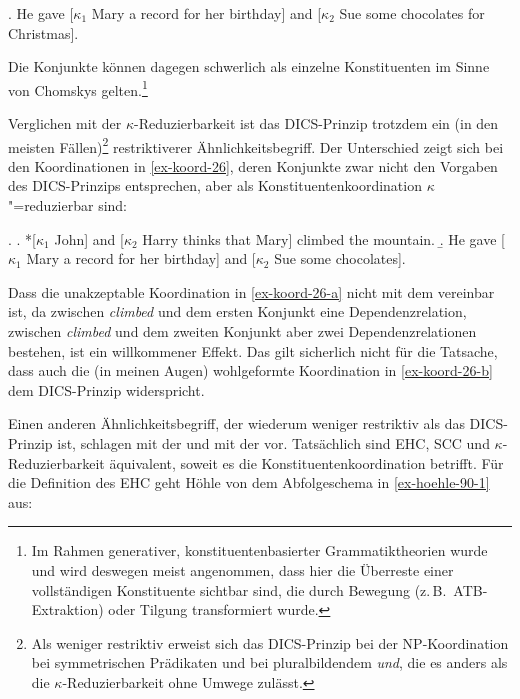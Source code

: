 \ex. \label{ex-hudson88-35} He gave [$\kappa_1$ Mary a record for her birthday] and [$\kappa_2$ Sue some chocolates for Christmas].\hfill \citep[(35)]{Hudson:88}

Die Konjunkte können dagegen schwerlich als einzelne Konstituenten im Sinne von Chomskys  gelten.\footnote{Im Rahmen generativer, konstituentenbasierter Grammatiktheorien wurde und wird deswegen meist angenommen, dass hier die Überreste einer vollständigen Konstituente sichtbar sind, die durch Bewegung (z.\,B.\ ATB-Extraktion) oder Tilgung transformiert wurde.}

Verglichen mit der $\kappa$-Reduzierbarkeit ist das DICS-Prinzip trotzdem ein (in den meisten Fällen)\footnote{Als weniger restriktiv erweist sich das DICS-Prinzip bei der NP-Koordination bei symmetrischen Prädikaten und bei pluralbildendem {\it und}, die es anders als die $\kappa$-Reduzierbarkeit ohne Umwege zulässt.} restriktiverer Ähnlichkeitsbegriff. Der Unterschied zeigt sich bei den Koordinationen in \ref{ex-koord-26}, deren Konjunkte zwar nicht den Vorgaben des DICS-Prinzips entsprechen, aber als Konstituentenkoordination $\kappa$"=reduzierbar sind:

\ex. \label{ex-koord-26}
\a. *[$\kappa_1$ John] and [$\kappa_2$ Harry thinks that Mary] climbed the mountain. \hfill \citep[(47a)]{Pickering:Barry:93}\label{ex-koord-26-a}
\b. He gave [$\kappa_1$ Mary a record for her birthday] and [$\kappa_2$ Sue some chocolates].\label{ex-koord-26-b} 

Dass die unakzeptable Koordination in \ref{ex-koord-26-a} nicht mit dem  vereinbar ist, da zwischen {\it climbed} und dem ersten Konjunkt eine Dependenzrelation, zwischen {\it climbed} und dem zweiten Konjunkt aber zwei Dependenzrelationen bestehen, ist ein willkommener Effekt. Das gilt sicherlich nicht für die Tatsache, dass auch die (in meinen Augen) wohlgeformte Koordination in \ref{ex-koord-26-b} dem DICS-Prinzip widerspricht. 

Einen anderen Ähnlichkeitsbegriff, der wiederum weniger restriktiv als das DICS-Prinzip ist, schlagen \cite{Hoehle:90,Hoehle:91} mit der  und \citet[305]{Kathol:99} mit der  vor. Tatsächlich sind EHC, SCC und $\kappa$-Reduzierbarkeit äquivalent, soweit es die Konstituentenkoordination betrifft. Für die Definition des EHC geht Höhle von dem Abfolgeschema in \ref{ex-hoehle-90-1} aus: 

